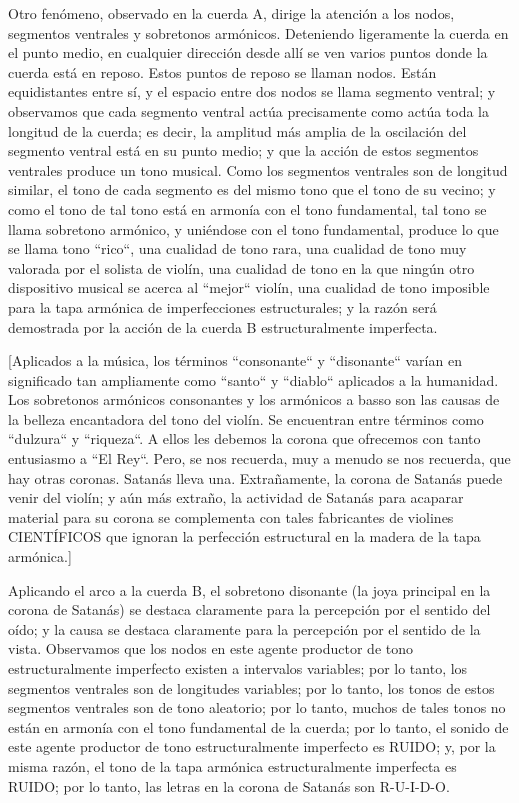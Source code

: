 \documentclass[12pt]{book}
\begin{document}
Otro fenómeno, observado en la cuerda A, dirige la atención a los nodos, segmentos ventrales y sobretonos armónicos. Deteniendo ligeramente la cuerda en el punto medio, en cualquier dirección desde allí se ven varios puntos donde la cuerda está en reposo. Estos puntos de reposo se llaman nodos. Están equidistantes entre sí, y el espacio entre dos nodos se llama segmento ventral; y observamos que cada segmento ventral actúa precisamente como actúa toda la longitud de la cuerda; es decir, la amplitud más amplia de la oscilación del segmento ventral está en su punto medio; y que la acción de estos segmentos ventrales produce un tono musical. Como los segmentos ventrales son de longitud similar, el tono de cada segmento es del mismo tono que el tono de su vecino; y como el tono de tal tono está en armonía con el tono fundamental, tal tono se llama sobretono armónico, y uniéndose con el tono fundamental, produce lo que se llama tono ``rico``, una cualidad de tono rara, una cualidad de tono muy valorada por el solista de violín, una cualidad de tono en la que ningún otro dispositivo musical se acerca al ``mejor`` violín, una cualidad de tono imposible para la tapa armónica de imperfecciones estructurales; y la razón será demostrada por la acción de la cuerda B estructuralmente imperfecta.

[Aplicados a la música, los términos ``consonante`` y ``disonante`` varían en significado tan ampliamente como ``santo`` y ``diablo`` aplicados a la humanidad. Los sobretonos armónicos consonantes y los armónicos a basso son las causas de la belleza encantadora del tono del violín. Se encuentran entre términos como ``dulzura`` y ``riqueza``. A ellos les debemos la corona que ofrecemos con tanto entusiasmo a ``El Rey``. Pero, se nos recuerda, muy a menudo se nos recuerda, que hay otras coronas. Satanás lleva una. Extrañamente, la corona de Satanás puede venir del violín; y aún más extraño, la actividad de Satanás para acaparar material para su corona se complementa con tales fabricantes de violines CIENTÍFICOS que ignoran la perfección estructural en la madera de la tapa armónica.]

Aplicando el arco a la cuerda B, el sobretono disonante (la joya principal en la corona de Satanás) se destaca claramente para la percepción por el sentido del oído; y la causa se destaca claramente para la percepción por el sentido de la vista. Observamos que los nodos en este agente productor de tono estructuralmente imperfecto existen a intervalos variables; por lo tanto, los segmentos ventrales son de longitudes variables; por lo tanto, los tonos de estos segmentos ventrales son de tono aleatorio; por lo tanto, muchos de tales tonos no están en armonía con el tono fundamental de la cuerda; por lo tanto, el sonido de este agente productor de tono estructuralmente imperfecto es RUIDO; y, por la misma razón, el tono de la tapa armónica estructuralmente imperfecta es RUIDO; por lo tanto, las letras en la corona de Satanás son R-U-I-D-O.
\end{document}
